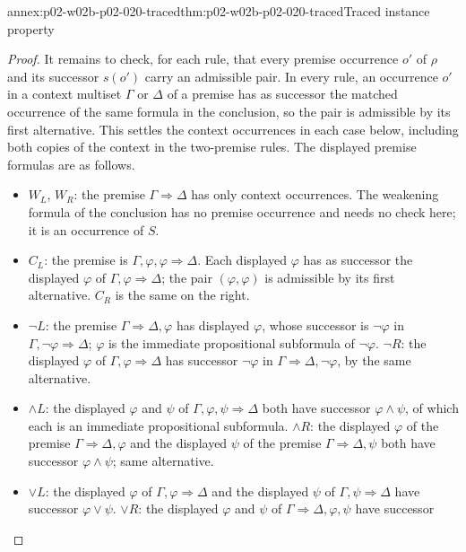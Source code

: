 \begin{annexitem}{annex:p02-w02b-p02-020-traced}{thm:p02-w02b-p02-020-traced}{Traced instance property}
\begin{proof}
It remains to check, for each rule, that every premise occurrence \(o'\) of
\(\rho\) and its successor \(s(o')\) carry an admissible pair.  In every rule,
an occurrence \(o'\) in a context multiset \(\Gamma\) or \(\Delta\) of a
premise has as successor the matched occurrence of the same formula in the
conclusion, so the pair is admissible by its first alternative.  This settles
the context occurrences in each case below, including both copies of the
context in the two-premise rules.  The displayed premise formulas are as
follows.
\begin{itemize}
  \item \(W_L\), \(W_R\): the premise \(\Gamma\Rightarrow\Delta\) has only
        context occurrences.  The weakening formula of the conclusion has no
        premise occurrence and needs no check here; it is an occurrence of
        \(S\).
  \item \(C_L\): the premise is \(\Gamma,\varphi,\varphi\Rightarrow\Delta\).
        Each displayed \(\varphi\) has as successor the displayed \(\varphi\)
        of \(\Gamma,\varphi\Rightarrow\Delta\); the pair
        \((\varphi,\varphi)\) is admissible by its first alternative.  \(C_R\)
        is the same on the right.
  \item \(\neg L\): the premise \(\Gamma\Rightarrow\Delta,\varphi\) has
        displayed \(\varphi\), whose successor is \(\neg\varphi\) in
        \(\Gamma,\neg\varphi\Rightarrow\Delta\); \(\varphi\) is the immediate
        propositional subformula of \(\neg\varphi\).  \(\neg R\): the
        displayed \(\varphi\) of \(\Gamma,\varphi\Rightarrow\Delta\) has
        successor \(\neg\varphi\) in \(\Gamma\Rightarrow\Delta,\neg\varphi\),
        by the same alternative.
  \item \(\land L\): the displayed \(\varphi\) and \(\psi\) of
        \(\Gamma,\varphi,\psi\Rightarrow\Delta\) both have successor
        \(\varphi\land\psi\), of which each is an immediate propositional
        subformula.  \(\land R\): the displayed \(\varphi\) of the premise
        \(\Gamma\Rightarrow\Delta,\varphi\) and the displayed \(\psi\) of the
        premise \(\Gamma\Rightarrow\Delta,\psi\) both have successor
        \(\varphi\land\psi\); same alternative.
  \item \(\lor L\): the displayed \(\varphi\) of
        \(\Gamma,\varphi\Rightarrow\Delta\) and the displayed \(\psi\) of
        \(\Gamma,\psi\Rightarrow\Delta\) have successor \(\varphi\lor\psi\).
        \(\lor R\): the displayed \(\varphi\) and \(\psi\) of
        \(\Gamma\Rightarrow\Delta,\varphi,\psi\) have successor

\end{itemize}
\end{proof}
\end{annexitem}
